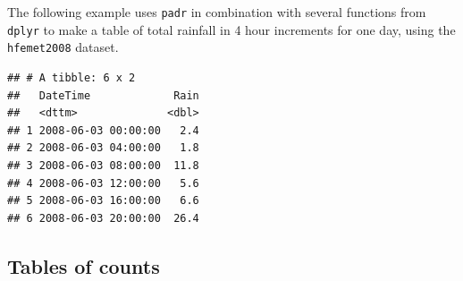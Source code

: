 \documentclass[]{book}
\newenvironment{Shaded}{\begin{snugshade}}{\end{snugshade}}
\newcommand{\CommentTok}[1]{\textcolor[rgb]{0.56,0.35,0.01}{\textit{#1}}}
\newcommand{\DataTypeTok}[1]{\textcolor[rgb]{0.13,0.29,0.53}{#1}}
\newcommand{\DecValTok}[1]{\textcolor[rgb]{0.00,0.00,0.81}{#1}}
\newcommand{\KeywordTok}[1]{\textcolor[rgb]{0.13,0.29,0.53}{\textbf{#1}}}
\newcommand{\NormalTok}[1]{#1}
\newcommand{\OperatorTok}[1]{\textcolor[rgb]{0.81,0.36,0.00}{\textbf{#1}}}
\newcommand{\StringTok}[1]{\textcolor[rgb]{0.31,0.60,0.02}{#1}}
\begin{document}
The following example uses \texttt{padr} in combination with several functions from \texttt{dplyr} to make a table of total rainfall in 4 hour increments for one day, using the \texttt{hfemet2008} dataset.

\begin{Shaded}
\end{Shaded}

\begin{verbatim}
## # A tibble: 6 x 2
##   DateTime             Rain
##   <dttm>              <dbl>
## 1 2008-06-03 00:00:00   2.4
## 2 2008-06-03 04:00:00   1.8
## 3 2008-06-03 08:00:00  11.8
## 4 2008-06-03 12:00:00   5.6
## 5 2008-06-03 16:00:00   6.6
## 6 2008-06-03 20:00:00  26.4
\end{verbatim}

\hypertarget{xtabs}{%
\subsection{Tables of counts}\label{xtabs}}
\end{document}
